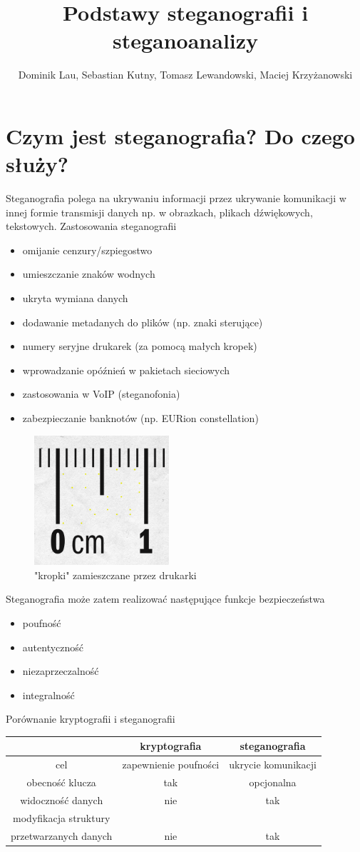 \documentclass{article}
\title{Podstawy steganografii i steganoanalizy}
\author{Dominik Lau, Sebastian Kutny, Tomasz Lewandowski, Maciej Krzyżanowski}
\begin{document}
\maketitle
\section{Czym jest steganografia? Do czego służy?}
Steganografia polega na ukrywaniu informacji przez ukrywanie komunikacji w innej formie transmisji danych
np. w obrazkach,  plikach dźwiękowych, tekstowych.  Zastosowania steganografii
\begin{itemize}
	\item omijanie cenzury/szpiegostwo
	\item umieszczanie znaków wodnych
	\item ukryta wymiana danych
	\item dodawanie metadanych do plików (np. znaki sterujące)
	\item numery seryjne drukarek (za pomocą małych kropek)
	\item wprowadzanie opóźnień w pakietach sieciowych
	\item zastosowania w VoIP (steganofonia)
	\item zabezpieczanie banknotów (np. EURion constellation)
\end{itemize}
\begin{figure}
	\centering
	\includegraphics[width=5cm]{stego_drukarkowa}
	\caption{"kropki" zamieszczane przez drukarki}
\end{figure}
Steganografia może zatem realizować następujące funkcje bezpieczeństwa
\begin{itemize}
	\item poufność
	\item autentyczność
	\item niezaprzeczalność
	\item integralność
\end{itemize}
Porównanie kryptografii i steganografii
\begin{center}
\begin{tabular}{c | c  c }
& kryptografia & steganografia \\
\hline
cel & zapewnienie poufności & ukrycie komunikacji \\
obecność klucza & tak & opcjonalna \\
widoczność danych & nie & tak \\
modyfikacja struktury  \\
 przetwarzanych danych & nie & tak
\end{tabular}
\end{center}
\end{document}

